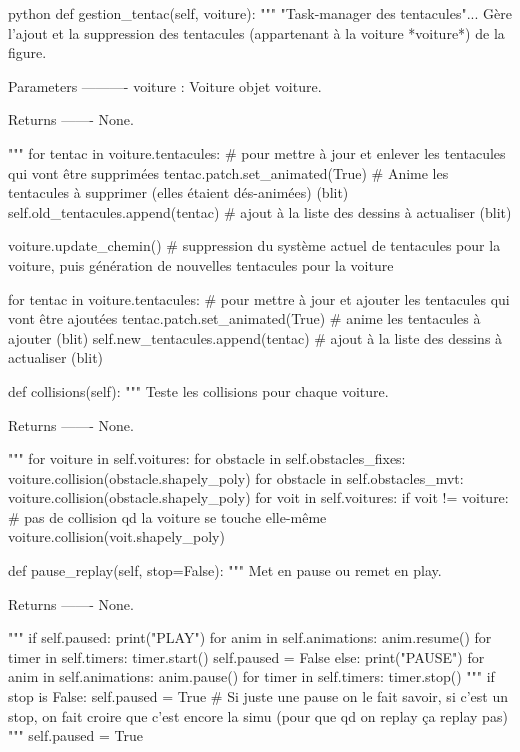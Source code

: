\begin{mintedbox}{python}
    def gestion_tentac(self, voiture):
        """
        "Task-manager des tentacules"... Gère l'ajout et la suppression des tentacules (appartenant à la voiture *voiture*) de la figure.

        Parameters
        ----------
        voiture : Voiture
            objet voiture.

        Returns
        -------
        None.

        """
        for tentac in voiture.tentacules:  # pour mettre à jour et enlever les tentacules qui vont être supprimées
            tentac.patch.set_animated(True)  # Anime les tentacules à supprimer (elles étaient dés-animées) (blit)
            self.old_tentacules.append(tentac)  # ajout à la liste des dessins à actualiser (blit)

        voiture.update_chemin()  # suppression du système actuel de tentacules pour la voiture, puis génération de nouvelles tentacules pour la voiture

        for tentac in voiture.tentacules:  # pour mettre à jour et ajouter les tentacules qui vont être ajoutées
            tentac.patch.set_animated(True)  # anime les tentacules à ajouter (blit)
            self.new_tentacules.append(tentac)  # ajout à la liste des dessins à actualiser (blit)

    def collisions(self):
        """
        Teste les collisions pour chaque voiture.

        Returns
        -------
        None.

        """
        for voiture in self.voitures:
            for obstacle in self.obstacles_fixes:
                voiture.collision(obstacle.shapely_poly)
            for obstacle in self.obstacles_mvt:
                voiture.collision(obstacle.shapely_poly)
            for voit in self.voitures:
                if voit != voiture:  # pas de collision qd la voiture se touche elle-même
                    voiture.collision(voit.shapely_poly)

    def pause_replay(self, stop=False):
        """
        Met en pause ou remet en play.

        Returns
        -------
        None.

        """
        if self.paused:
            print("PLAY")
            for anim in self.animations:
                anim.resume()
            for timer in self.timers:
                timer.start()
            self.paused = False
        else:
            print("PAUSE")
            for anim in self.animations:
                anim.pause()
            for timer in self.timers:
                timer.stop()
                """
            if stop is False:
                self.paused = True  # Si juste une pause on le fait savoir, si c'est un stop, on fait croire que c'est encore la simu (pour que qd on replay ça replay pas)
                """
            self.paused = True


\end{mintedbox}
